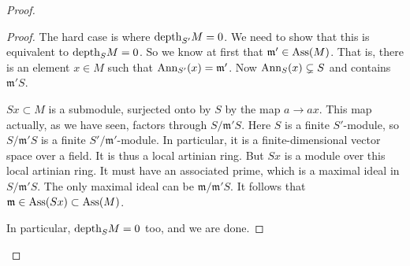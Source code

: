 \begin{example}
\begin{proof}
\begin{proof}
The hard case is where $\mathrm{depth}_{S'} M = 0$. We need to show that
this is
equivalent to $\mathrm{depth}_{S} M = 0$. So we know at first that
$\mathfrak{m}' \in
\operatorname{Ass}(M)$. That is, there is an element $x \in M$ such that
$\operatorname{Ann}_{S'}(x) =
\mathfrak{m}'$.
Now $\operatorname{Ann}_S(x) \subsetneq S$ and contains $\mathfrak{m}' S$.

$Sx \subset M$ is a submodule, surjected onto by $S$ by the map
$a \to ax$.
This map actually, as we have seen, factors through
$S/\mathfrak{m}' S$. Here
$S$ is a finite $S'$-module, so $S/\mathfrak{m}'S$ is a finite
$S'/\mathfrak{m}'$-module. In particular, it is a
finite-dimensional vector space
over a field. It is thus a local artinian ring. But $Sx$ is a
module over this
local artinian ring. It must have an associated prime, which is
a maximal
ideal in $S/\mathfrak{m}'S$. The only maximal ideal can be
$\mathfrak{m}/\mathfrak{m}'S$. It follows that $\mathfrak{m} \in
\operatorname{Ass}(Sx)
\subset \operatorname{Ass}(M)$.

In particular, $\mathrm{depth}_S M = 0$ too, and we are done.
\end{proof} 

\end{proof} 
\end{example} 
